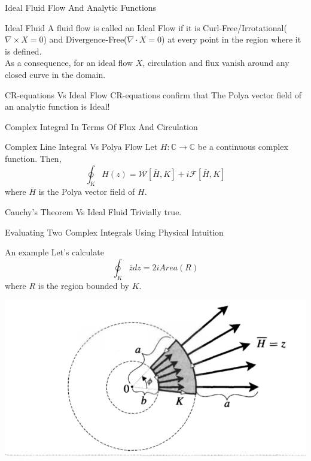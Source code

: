 \documentclass[9pt]{beamer}
\begin{document}
\begin{frame}{Ideal Fluid Flow And Analytic Functions}
  \begin{block}{Ideal Fluid}
    A fluid flow is called an Ideal Flow if it is Curl-Free/Irrotational($\nabla\times X=0$) and 
    Divergence-Free($\nabla\cdot X=0$) at every point in the region where it is defined.\\
    As a consequence, for an ideal flow $X$, circulation and flux vanish around any closed curve in the domain.\\ 
  \end{block}
  \pause
  \begin{block}{CR-equations Vs Ideal Flow}
    CR-equations confirm that The Polya vector field of an analytic function is Ideal!\\   
  \end{block}
\end{frame}

\begin{frame}{Complex Integral In Terms Of Flux And Circulation}
  \begin{block}{Complex Line Integral Vs Polya Flow}
    Let $H:\mathbb{C}\to\mathbb{C}$ be a continuous complex function. Then,
    $$\oint_KH(z)=\mathcal{W}[\bar{H},K]+i\mathcal{F}[\bar{H},K]$$
    where $\bar{H}$ is the Polya vector field of $H$.
  \end{block}
 \end{frame}

\begin{frame}{Cauchy's Theorem Vs Ideal Fluid}
  Trivially true. 
\end{frame}

\begin{frame}{Evaluating Two Complex Integrals Using Physical Intuition}
  \begin{block}{An example}
    Let's calculate 
    $$\oint_K\bar{z}dz=2iArea(R)$$
    where $R$ is the region bounded by $K$.
  \end{block}
  \begin{center}
   \includegraphics[scale=0.3]{example.png}
  \end{center}
\end{frame}
\end{document}
